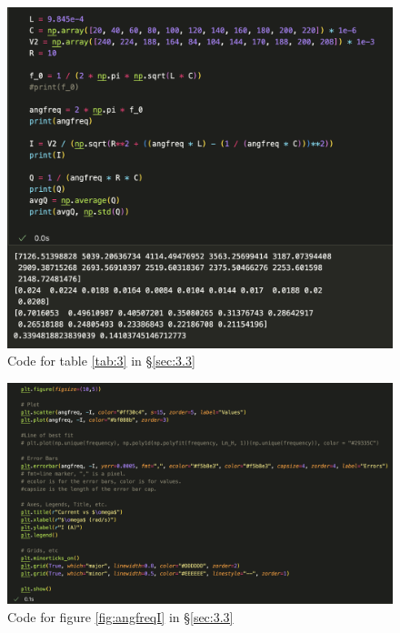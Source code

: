 \documentclass[12pt]{article}
\begin{document}
\begin{figure}[H]
    \centering
    \includegraphics[width=15cm]{lcr code 4.png}
    \caption{\centering Code for table \ref{tab:3} in §\ref{sec:3.3}}
\end{figure}

\begin{figure}[H]
    \centering
    \includegraphics[width=15cm]{lcr code 5.png}
    \caption{\centering Code for figure \ref{fig:angfreqI} in §\ref{sec:3.3}}
\end{figure}

\newpage

\listoffigures

\listoftables
\end{document}
